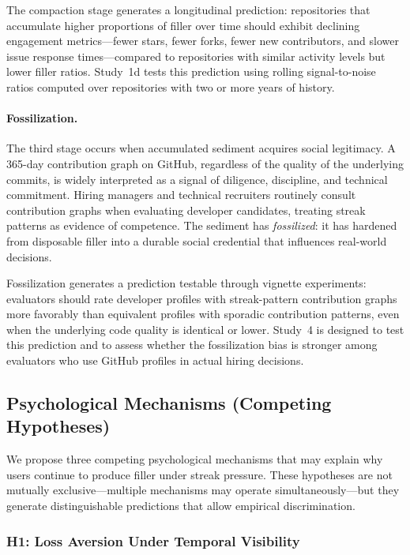 \documentclass[12pt]{article}
\begin{document}
The compaction stage generates a longitudinal prediction: repositories that accumulate higher proportions of filler over time should exhibit declining engagement metrics---fewer stars, fewer forks, fewer new contributors, and slower issue response times---compared to repositories with similar activity levels but lower filler ratios. Study~1d tests this prediction using rolling signal-to-noise ratios computed over repositories with two or more years of history.

\paragraph{Fossilization.}
The third stage occurs when accumulated sediment acquires social legitimacy. A 365-day contribution graph on GitHub, regardless of the quality of the underlying commits, is widely interpreted as a signal of diligence, discipline, and technical commitment. Hiring managers and technical recruiters routinely consult contribution graphs when evaluating developer candidates, treating streak patterns as evidence of competence. The sediment has \emph{fossilized}: it has hardened from disposable filler into a durable social credential that influences real-world decisions.

Fossilization generates a prediction testable through vignette experiments: evaluators should rate developer profiles with streak-pattern contribution graphs more favorably than equivalent profiles with sporadic contribution patterns, even when the underlying code quality is identical or lower. Study~4 is designed to test this prediction and to assess whether the fossilization bias is stronger among evaluators who use GitHub profiles in actual hiring decisions.

\subsection{Psychological Mechanisms (Competing Hypotheses)}
\label{sec:psychological-mechanisms}

We propose three competing psychological mechanisms that may explain why users continue to produce filler under streak pressure. These hypotheses are not mutually exclusive---multiple mechanisms may operate simultaneously---but they generate distinguishable predictions that allow empirical discrimination.

\subsubsection{H1: Loss Aversion Under Temporal Visibility}
\label{sec:h1-loss-aversion}
\end{document}
